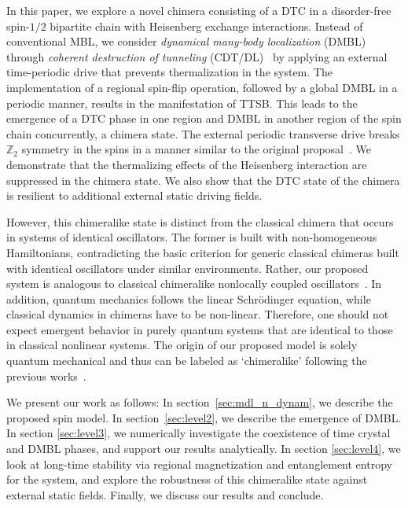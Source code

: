 \documentclass[12pt]{iopart}
\begin{document}
In this paper, we explore a novel chimera consisting of a DTC in a disorder-free spin-$1/2$ bipartite chain with Heisenberg exchange interactions. Instead of conventional MBL, we consider \textit{dynamical many-body localization} (DMBL)~\cite{Keser2016, haldar_dynamical_2017,haldar_dynamical_2021,bhattacharyya_transverse_2012,aditya2023dynamical,dutta2014,das_exotic_2010} through \textit{coherent destruction of tunneling} (CDT/DL)~\cite{Grossmann1991,Kayanuma2008} by applying an external time-periodic drive that prevents thermalization in the system. The implementation of a regional spin-flip operation, followed by a global DMBL in a periodic manner, results in the manifestation of TTSB. This leads to the emergence of a DTC phase in one region and DMBL in another region of the spin chain concurrently, a chimera state.  The external periodic transverse drive breaks $\mathbb{Z}_2$ symmetry in the spins in a manner similar to the original proposal~\cite{sakurai_phys_nodate}. We demonstrate that the thermalizing effects of the Heisenberg interaction are suppressed in the chimera state. We also show that the DTC state of the chimera is resilient to additional external static driving fields. 

However, this chimeralike state is distinct from the classical chimera that occurs in systems of identical oscillators. The former is built with non-homogeneous Hamiltonians, contradicting the basic criterion for generic classical chimeras built with identical oscillators under similar environments. Rather, our proposed system is analogous to classical chimeralike nonlocally coupled oscillators~\cite{Jyoti2021,nkomo_chimera_2016}. In addition, quantum mechanics follows the linear Schr\"{o}dinger equation, while classical dynamics in chimeras have to be non-linear. Therefore, one should not expect emergent behavior in purely quantum systems that are identical to those in classical nonlinear systems. The origin of our proposed model is solely quantum mechanical and thus can be labeled as `chimeralike' following the previous works~\cite{Sakurai_Napolitano_2020, Jyoti2021}. 

We present our work as follows: In section~\ref{sec:mdl_n_dynam}, we describe the proposed spin model. In section~\ref{sec:level2}, we describe the emergence of DMBL. In section \ref{sec:level3}, we numerically investigate the coexistence of time crystal and DMBL phases, and support our results analytically. In section \ref{sec:level4}, we look at long-time stability via regional magnetization and entanglement entropy for the system, and explore the robustness of this chimeralike state against external static fields. Finally, we discuss our results and conclude.	
	
\end{document}
